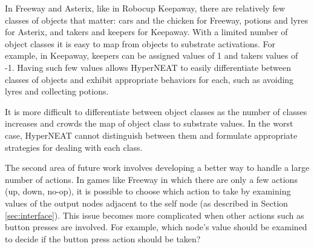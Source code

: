 \documentclass{acm_proc_article-sp}
\begin{document}
In Freeway and Asterix, like in Robocup Keepaway, there are relatively few classes of objects that matter: cars and the chicken for Freeway, potions and lyres for Asterix, and takers and keepers for Keepaway. With a limited number of object classes it is easy to map from objects to substrate activations. For example, in Keepaway, keepers can be assigned values of 1 and takers values of -1. Having such few values allows HyperNEAT to easily differentiate between classes of objects and exhibit appropriate behaviors for each, such as avoiding lyres and collecting potions.

It is more difficult to differentiate between object classes as the number of classes increases and crowds the map of object class to substrate values. In the worst case, HyperNEAT cannot distinguish between them and formulate appropriate strategies for dealing with each class.


The second area of future work involves developing a better way to handle a large number of actions. In games like Freeway in which there are only a few actions (up, down, no-op), it is possible to choose which action to take by examining values of the output nodes adjacent to the self node (as described in Section \ref{sec:interface}). This issue becomes more complicated when other actions such as button presses are involved. For example, which node's value should be examined to decide if the button press action should be taken? 

\end{document}
